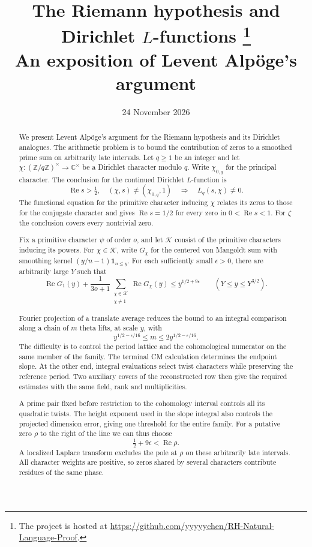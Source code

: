 \documentclass[11pt]{article}
\title{The Riemann hypothesis and Dirichlet \(L\)-functions%
\thanks{The project is hosted at \url{https://github.com/yyyyychen/RH-Natural-Language-Proof}.}\\
\large An exposition of Levent Alp\"oge's argument}
\author{}
\date{24 November 2026}
\theoremstyle{definition}
\theoremstyle{plain}
\newcommand{\RePart}{\operatorname{Re}}
\begin{document}
\maketitle

\begin{abstract}
We present Levent Alp\"oge's argument for the Riemann hypothesis and its Dirichlet analogues. The arithmetic problem is to bound the contribution of zeros to a smoothed prime sum on arbitrarily late intervals.
Let \(q\ge1\) be an integer and let \(\chi:(\mathbb Z/q\mathbb Z)^\times\to\mathbb C^\times\)
be a Dirichlet character modulo \(q\). Write \(\chi_{0,q}\) for the principal
character. The conclusion for the continued Dirichlet \(L\)-function is
\[
 \RePart s>\tfrac12,\quad (\chi,s)\ne(\chi_{0,q},1)
 \quad\Longrightarrow\quad L_q(s,\chi)\ne0.
\]
The functional equation for the primitive character inducing \(\chi\)
relates its zeros to those for the conjugate character and gives
\(\RePart s=1/2\) for every zero in \(0<\RePart s<1\). For
\(\zeta\) the conclusion covers every nontrivial zero.

Fix a primitive character \(\psi\) of order \(o\), and let
\(\mathcal K\) consist of the primitive characters inducing its powers.
For \(\chi\in\mathcal K\), write \(G_\chi\) for the centered von Mangoldt sum with smoothing
kernel \((y/n-1)\mathbf 1_{n\le y}\). For each sufficiently small
\(\epsilon>0\), there are arbitrarily large \(Y\) such that
\[
 \RePart G_1(y)+\frac{1}{3o+1}
       \sum_{\substack{\chi\in\mathcal K\\\chi\ne1}}\RePart G_\chi(y)
 \le y^{1/2+9\epsilon}\qquad (Y\le y\le Y^{3/2}).
\]

Fourier projection of a translate average reduces the bound to
an integral comparison along a chain of \(m\) theta lifts, at scale \(y\), with
\[
             y^{1/2-\epsilon/16}\le m\le 2y^{1/2-\epsilon/16}.
\]
The difficulty is to control the period lattice and the cohomological
numerator on the same member of the family. The terminal CM
calculation determines the endpoint slope. At the other end, integral
evaluations select twist characters while preserving the reference
period. Two auxiliary covers of the reconstructed row then give the
required estimates with the same field, rank and multiplicities.

A prime pair fixed before restriction to the cohomology interval
controls all its quadratic twists. The height exponent used in
the slope integral also controls the projected dimension error,
giving one threshold for the entire family. For a putative zero
\(\rho\) to the right of the line we can thus choose
\[
                       \tfrac12+9\epsilon<\RePart\rho .
\]
A localized Laplace transform excludes the pole at \(\rho\) on
these arbitrarily late intervals. All character weights are positive,
so zeros shared by several characters contribute residues of the same phase.
\end{abstract}
\end{document}
